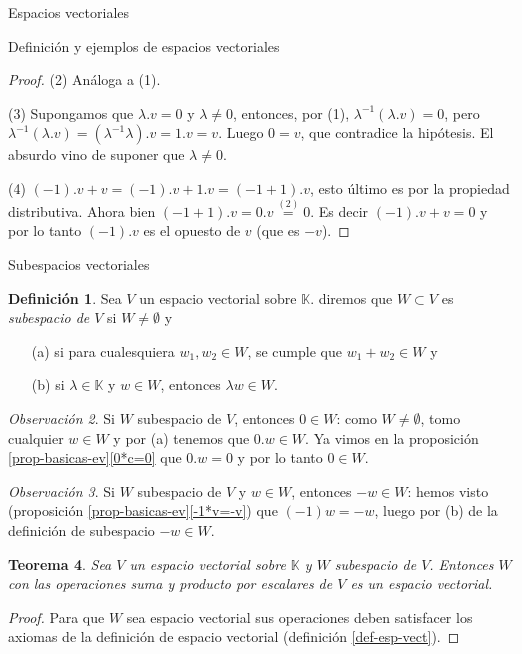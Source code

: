 \documentclass[a4paper,12pt,twoside,spanish,reqno]{amsbook}
\numberwithin{equation}{section}
\newtheorem{teorema}{Teorema}[section]
\theoremstyle{definition}
\newtheorem{definicion}[teorema]{Definici\'on}
\theoremstyle{remark}
\newtheorem{observacion}[teorema]{Observaci\'on}
\newcommand{\K}{\mathbb K}
\begin{document}
\begin{chapter}{Espacios vectoriales}
\begin{section}{Definición y ejemplos de espacios vectoriales}
\begin{proof}
                (2) Análoga a (1).
                
                (3) Supongamos que  $\lambda.v=0$ y  $\lambda \ne 0$, entonces, por (1), $ \lambda^{-1}(\lambda.v)=0$, pero $\lambda^{-1}(\lambda.v) = (\lambda^{-1}\lambda).v = 1.v = v$. Luego $0=v$,  que contradice la hipótesis. El absurdo vino de suponer que $\lambda \ne 0$.
                
                (4)  $(-1).v +v = (-1).v +1.v = (-1+1).v$,  esto último es por la propiedad distributiva. Ahora bien $(-1+1).v = 0.v \overset{(2)}{=} 0$. Es decir   $(-1).v +v = 0$ y por lo tanto  $(-1).v$ es el opuesto de $v$ (que es $-v$).  
            
            \end{proof}
   
\end{section}
    
\begin{section}{Subespacios vectoriales}\label{seccion-subespacios-vectoriales}
    \begin{definicion}
        Sea $V$ un espacio vectorial sobre $\K$. diremos que $W \subset V$ es \textit{subespacio de $V$} si $W \not= \emptyset$ y
        \begin{enumerate}
            \item[(a)] si para cualesquiera $w_1,w_2 \in W$, se cumple que $w_1+w_2 \in W$ y
            \item[(b)] si $\lambda \in \K$ y  $w \in W$, entonces $\lambda w \in W$.
        \end{enumerate}
    \end{definicion}

    \begin{observacion}\label{obs-0-en-subespacio} Si $W$ subespacio de $V$,  entonces $0 \in W$: como  $W \ne \emptyset$, tomo  cualquier $w \in W$ y  por (a) tenemos que $0.w \in W$. Ya vimos en la proposición \ref{prop-basicas-ev}\ref{0*c=0}  que $0.w =0$ y por lo tanto $0 \in W$. 
    \end{observacion}

    \begin{observacion}\label{obs-opuesto-en-subespacio} Si $W$ subespacio de $V$ y $w \in W$,  entonces $-w \in W$: hemos visto (proposición \ref{prop-basicas-ev}\ref{-1*v=-v}) que  $(-1)w=-w $, luego por (b) de la definición de subespacio $-w \in W$.
    \end{observacion}

    \begin{teorema}
        Sea $V$ un espacio vectorial sobre $\K$ y $W$ subespacio de $V$. Entonces $W$ con las operaciones suma y producto por escalares de $V$ es un espacio vectorial.
    \end{teorema}
    \begin{proof} 
        Para que $W$ sea espacio vectorial sus operaciones deben satisfacer los axiomas de la definición de espacio vectorial (definición \ref{def-esp-vect}). 
        

\end{proof}
\end{section}
\end{chapter}
\end{document}
